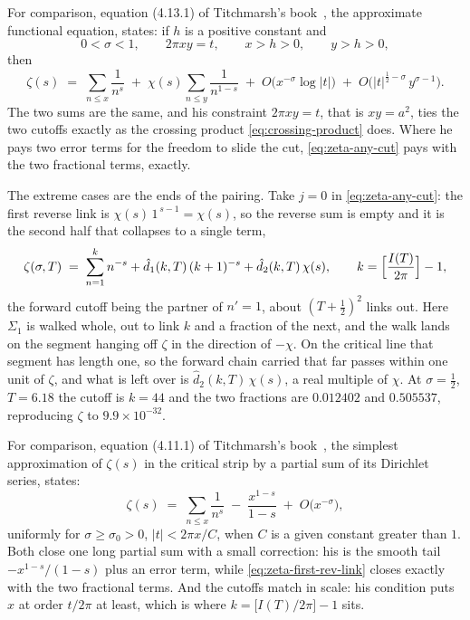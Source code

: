 \documentclass[11pt]{article}
\theoremstyle{definition}
\begin{document}
For comparison, equation (4.13.1) of Titchmarsh's
book~\cite[\S4.13]{Titchmarsh1986}, the approximate functional equation,
states: if $h$ is a positive constant and
\[
0<\sigma<1,\qquad 2\pi xy=t,\qquad x>h>0,\qquad y>h>0,
\]
then
\begin{equation}\label{eq:titchmarsh-afe}
\zeta(s)\;=\;\sum_{n\le x}\frac{1}{n^{s}}
\;+\;\chi(s)\sum_{n\le y}\frac{1}{n^{1-s}}
\;+\;O\bigl(x^{-\sigma}\log|t|\bigr)
\;+\;O\bigl(|t|^{\frac12-\sigma}\,y^{\sigma-1}\bigr).
\end{equation}
The two sums are the same, and his constraint $2\pi xy=t$, that is
$xy=a^{2}$, ties the two cutoffs exactly as the crossing product
\eqref{eq:crossing-product} does. Where he pays two error terms for the
freedom to slide the cut, \eqref{eq:zeta-any-cut} pays with the two
fractional terms, exactly.

The extreme cases are the ends of the pairing. Take $j=0$ in
\eqref{eq:zeta-any-cut}: the first reverse link is
$\chi(s)\,1^{\,s-1}=\chi(s)$, so the reverse sum is empty and it is the second
half that collapses to a single term,
\begin{equation}\label{eq:zeta-first-rev-link}
\zeta(\sigma,T)
\;=\;
\sum_{n=1}^{k}n^{-s}+\hat d_1(k,T)\,(k+1)^{-s}+\hat d_2(k,T)\,\chi(s),
\qquad k=\Bigl[\frac{I(T)}{2\pi}\Bigr]-1,
\end{equation}
the forward cutoff being the partner of $n'=1$, about $(T+\tfrac12)^{2}$
links out. Here $\Sigma_1$ is walked whole, out to link $k$ and a fraction of the next, and the walk
lands on the segment hanging off $\zeta$ in the direction of $-\chi$. On the
critical line that segment has length one, so the forward chain carried that
far passes within one unit of $\zeta$, and what is left over is
$\hat d_2(k,T)\,\chi(s)$, a real multiple of $\chi$. At $\sigma=\tfrac12$,
$T=6.18$ the cutoff is $k=44$ and the two fractions are $0.012402$ and
$0.505537$, reproducing $\zeta$ to $9.9\times10^{-32}$.

For comparison, equation (4.11.1) of Titchmarsh's
book~\cite[\S4.11]{Titchmarsh1986}, the simplest approximation of
$\zeta(s)$ in the critical strip by a partial sum of its Dirichlet
series, states:
\begin{equation}\label{eq:titchmarsh-partial-sum}
\zeta(s)\;=\;\sum_{n\le x}\frac{1}{n^{s}}
\;-\;\frac{x^{1-s}}{1-s}
\;+\;O\bigl(x^{-\sigma}\bigr),
\end{equation}
uniformly for $\sigma\ge\sigma_0>0$, $|t|<2\pi x/C$, when $C$ is a given
constant greater than $1$. Both close one long partial sum with a small
correction: his is the smooth tail $-x^{1-s}/(1-s)$ plus an error term,
while \eqref{eq:zeta-first-rev-link} closes exactly with the two
fractional terms. And the cutoffs match in scale: his condition puts $x$
at order $t/2\pi$ at least, which is where
$k=\bigl[I(T)/2\pi\bigr]-1$ sits.
\end{document}
